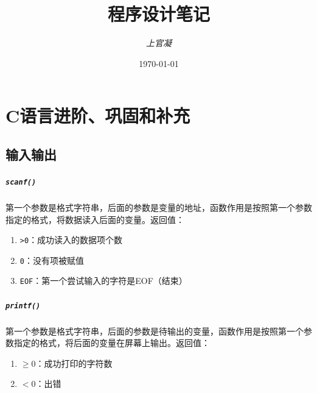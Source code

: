 \documentclass[]{report}
\title{\Huge \color{DarkRed} 程序设计笔记}
\author{\textit{上官凝}}
\date{\today}
\begin{document}
\theoremstyle{definition} \newtheorem{theorem}{Thm}[section] %
\theoremstyle{definition} \newtheorem{definition}{Def}[section] %
\theoremstyle{plain} \newtheorem{lemma}{lemma}[section] %

	\maketitle
	\newpage

	\tableofcontents
	\newpage

	\chapter{C语言进阶、巩固和补充}
	\section{输入输出}
		\paragraph{\texttt{scanf()}} 第一个参数是格式字符串，后面的参数是变量的地址，函数作用是按照第一个参数指定的格式，将数据读入后面的变量。返回值：
		\begin{enumerate}
			\item \verb|>0|：成功读入的数据项个数
			\item \verb|0|：没有项被赋值
			\item \verb|EOF|：第一个尝试输入的字符是EOF（结束）
		\end{enumerate}
		\paragraph{\texttt{printf()}} 第一个参数是格式字符串，后面的参数是待输出的变量，函数作用是按照第一个参数指定的格式，将后面的变量在屏幕上输出。返回值：
		\begin{enumerate}
			\item $\ge0$：成功打印的字符数
			\item $<0$：出错
		\end{enumerate}
\end{document}
